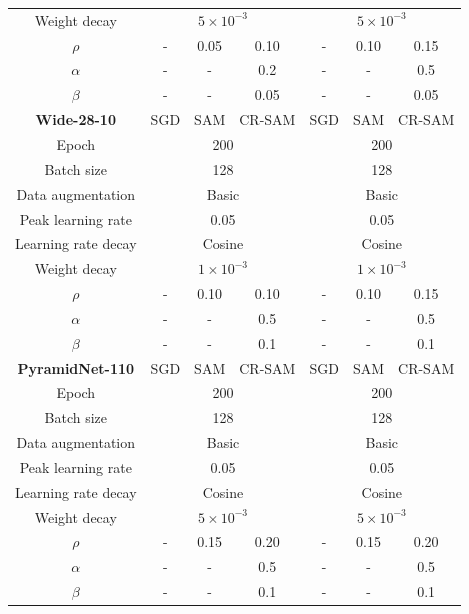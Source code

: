 \documentclass[letterpaper]{article} %
\theoremstyle{plain}
\theoremstyle{definition}
\begin{document}
\begin{table}[h!]
\begin{tabular}{c|ccc|ccc}
   Weight decay &\multicolumn{3}{c|}{$5\times10^{-3}$}&\multicolumn{3}{c}{$5\times10^{-3}$}\\
   $\rho$ & -&0.05&0.10&-&0.10&0.15\\
   $\alpha$ &-&-&0.2&-&-&0.5\\
   $\beta$ &-&-&0.05&-&-&0.05\\
      \midrule
      \textbf{Wide-28-10}   & SGD & SAM &CR-SAM& SGD & SAM &CR-SAM\\
         \midrule
   Epoch&\multicolumn{3}{c|}{200}&\multicolumn{3}{c}{200}\\
   Batch size&\multicolumn{3}{c|}{128}&\multicolumn{3}{c}{128}\\
   Data augmentation &\multicolumn{3}{c|}{Basic}&\multicolumn{3}{c}{Basic}\\
   Peak learning rate &\multicolumn{3}{c|}{0.05}&\multicolumn{3}{c}{0.05}\\
   Learning rate decay &\multicolumn{3}{c|}{Cosine}&\multicolumn{3}{c}{Cosine}\\
   Weight decay &\multicolumn{3}{c|}{$1\times10^{-3}$}&\multicolumn{3}{c}{$1\times10^{-3}$}\\
   $\rho$ & -&0.10&0.10&-&0.10&0.15\\
   $\alpha$ &-&-&0.5&-&-&0.5\\
   $\beta$ &-&-&0.1&-&-&0.1\\
\midrule
      \textbf{PyramidNet-110}   & SGD & SAM &CR-SAM& SGD & SAM &CR-SAM\\
   \midrule
   Epoch&\multicolumn{3}{c|}{200}&\multicolumn{3}{c}{200}\\
   Batch size&\multicolumn{3}{c|}{128}&\multicolumn{3}{c}{128}\\
   Data augmentation &\multicolumn{3}{c|}{Basic}&\multicolumn{3}{c}{Basic}\\
   Peak learning rate &\multicolumn{3}{c|}{0.05}&\multicolumn{3}{c}{0.05}\\
   Learning rate decay &\multicolumn{3}{c|}{Cosine}&\multicolumn{3}{c}{Cosine}\\
   Weight decay &\multicolumn{3}{c|}{$5\times10^{-3}$}&\multicolumn{3}{c}{$5\times10^{-3}$}\\

   $\rho$ & -&0.15&0.20&-&0.15&0.20\\
   $\alpha$ &-&-&0.5&-&-&0.5\\
   $\beta$ &-&-&0.1&-&-&0.1\\
    \bottomrule
      
  \end{tabular}
  
  \label{tab:hyper_cifar}
  \vspace{-0.5em}
\end{table}
\end{document}
